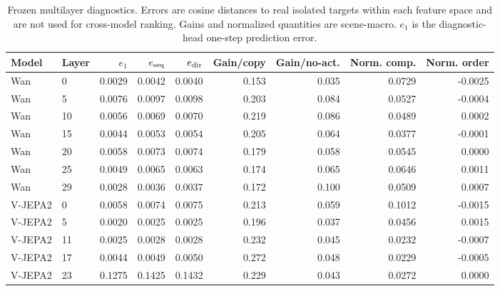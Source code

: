 \begin{table}[t]
\centering
\small
\caption{Frozen multilayer diagnostics. Errors are cosine distances to real isolated targets within each feature space and are not used for cross-model ranking. Gains and normalized quantities are scene-macro. $e_1$ is the diagnostic-head one-step prediction error.}
\label{tab:se3_multilayer}
\begin{tabular}{llrrrrrrr}
\toprule
Model & Layer & $e_1$ & $e_{\rm seq}$ & $e_{\rm dir}$ & Gain/copy & Gain/no-act. & Norm. comp. & Norm. order \\
\midrule
Wan & 0 & 0.0029 & 0.0042 & 0.0040 & 0.153 & 0.035 & 0.0729 & -0.0025 \\
Wan & 5 & 0.0076 & 0.0097 & 0.0098 & 0.203 & 0.084 & 0.0527 & -0.0004 \\
Wan & 10 & 0.0056 & 0.0069 & 0.0070 & 0.219 & 0.086 & 0.0489 & 0.0002 \\
Wan & 15 & 0.0044 & 0.0053 & 0.0054 & 0.205 & 0.064 & 0.0377 & -0.0001 \\
Wan & 20 & 0.0058 & 0.0073 & 0.0074 & 0.179 & 0.058 & 0.0545 & 0.0000 \\
Wan & 25 & 0.0049 & 0.0065 & 0.0063 & 0.174 & 0.065 & 0.0646 & 0.0011 \\
Wan & 29 & 0.0028 & 0.0036 & 0.0037 & 0.172 & 0.100 & 0.0509 & 0.0007 \\
V-JEPA2 & 0 & 0.0058 & 0.0074 & 0.0075 & 0.213 & 0.059 & 0.1012 & -0.0015 \\
V-JEPA2 & 5 & 0.0020 & 0.0025 & 0.0025 & 0.196 & 0.037 & 0.0456 & 0.0015 \\
V-JEPA2 & 11 & 0.0025 & 0.0028 & 0.0028 & 0.232 & 0.045 & 0.0232 & -0.0007 \\
V-JEPA2 & 17 & 0.0044 & 0.0049 & 0.0050 & 0.272 & 0.048 & 0.0229 & -0.0005 \\
V-JEPA2 & 23 & 0.1275 & 0.1425 & 0.1432 & 0.229 & 0.043 & 0.0272 & 0.0000 \\
\bottomrule
\end{tabular}
\end{table}
